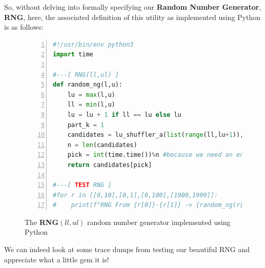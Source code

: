 \documentclass[a4paper, 18pt]{book} %
\begin{document}
So, without delving into formally specifying our \textbf{Random Number Generator}, \textbf{RNG}, here, the associated definition of this utility as implemented using Python is as follows:

\begin{figure}[H]
  \begin{center}
  \begin{lstlisting}[caption={The RNG}, label={LST_RNG}, language=Python, frame=single, numbers=left, basicstyle=\ttfamily,  commentstyle=\color{blue}]
#!/usr/bin/env python3
import time

#---[ RNG(ll,ul) ]
def random_ng(l,u):
    lu = max(l,u)
    ll = min(l,u)
    lu = lu + 1 if ll == lu else lu
    part_k = 1
    candidates = lu_shuffler_a(list(range(ll,lu+1)),part_k)[0]
    n = len(candidates)
    pick = int(time.time())%n #because we need an entropy source!
    return candidates[pick]

#---[ TEST RNG ]
#for r in [[0,10],[0,1],[0,100],[1900,1999]]:
#    print(f"RNG From {r[0]}-{r[1]} -> {random_ng(r[0],r[1])}")
\end{lstlisting}
  \end{center}
  \caption{The \textbf{RNG}$(ll,ul)$ random number generator implemented using Python}
\end{figure}


We can indeed look at some trace dumps from testing our beautiful RNG and appreciate what a little gem it is!
\end{document}
